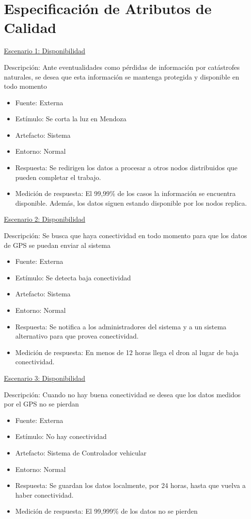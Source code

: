 \section{Especificación de Atributos de Calidad}

\underline{Escenario 1: Disponibilidad}


Descripción: Ante eventualidades como pérdidas de información por catástrofes naturales, se desea que esta información se mantenga protegida y disponible en todo momento
\begin{itemize}
\item Fuente: Externa
\item Estímulo: Se corta la luz en Mendoza
\item Artefacto: Sistema
\item Entorno: Normal
\item Respuesta: Se redirigen los datos a procesar a otros nodos distribuidos que pueden completar el trabajo.  
\item Medición de respuesta: El 99,99\% de los casos la información se encuentra disponible. Además, los datos siguen estando disponible por los nodos replica.

\end{itemize} 

\underline{Escenario 2: Disponibilidad}


Descripción: Se busca que haya conectividad en todo momento para que los datos de GPS se puedan enviar al sistema
\begin{itemize}
\item Fuente: Externa
\item Estímulo: Se detecta baja conectividad
\item Artefacto: Sistema
\item Entorno: Normal
\item Respuesta: Se notifica a los administradores del sistema y a un sistema alternativo para que provea conectividad.
\item Medición de respuesta: En menos de 12 horas llega el dron al lugar de baja conectividad.
\end{itemize} 

\underline{Escenario 3: Disponibilidad}


Descripción: Cuando no hay buena conectividad se desea que los datos medidos por el GPS no se pierdan
\begin{itemize}
\item Fuente: Externa
\item Estímulo: No hay conectividad
\item Artefacto: Sistema de Controlador vehicular
\item Entorno: Normal
\item Respuesta: Se guardan los datos localmente, por 24 horas, hasta que vuelva a haber conectividad.
\item Medición de respuesta: El 99,999\% de los datos no se pierden
\end{itemize} 


